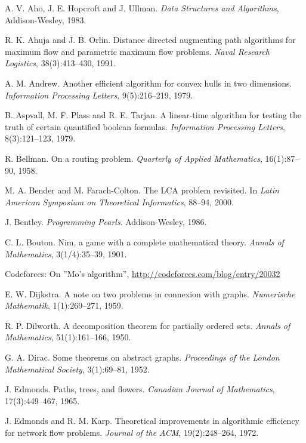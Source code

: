 \begin{thebibliography}{9}

  A. V. Aho, J. E. Hopcroft and J. Ullman.
  \emph{Data Structures and Algorithms},
  Addison-Wesley, 1983.

  R. K. Ahuja and J. B. Orlin.
  Distance directed augmenting path algorithms for maximum flow and parametric maximum flow problems.
  \emph{Naval Research Logistics}, 38(3):413--430, 1991.

  A. M. Andrew.
  Another efficient algorithm for convex hulls in two dimensions.
  \emph{Information Processing Letters}, 9(5):216--219, 1979.

  B. Aspvall, M. F. Plass and R. E. Tarjan.
  A linear-time algorithm for testing the truth of certain quantified boolean formulas.
  \emph{Information Processing Letters}, 8(3):121--123, 1979.

  R. Bellman.
  On a routing problem.
  \emph{Quarterly of Applied Mathematics}, 16(1):87--90, 1958.

  M. A. Bender and M. Farach-Colton.
  The LCA problem revisited. In
  \emph{Latin American Symposium on Theoretical Informatics}, 88--94, 2000.

  J. Bentley.
  \emph{Programming Pearls}.
  Addison-Wesley, 1986.

  C. L. Bouton.
  Nim, a game with a complete mathematical theory.
  \emph{Annals of Mathematics}, 3(1/4):35--39, 1901.

  Codeforces: On ''Mo's algorithm'',
  \url{http://codeforces.com/blog/entry/20032}

  E. W. Dijkstra.
  A note on two problems in connexion with graphs.
  \emph{Numerische Mathematik}, 1(1):269--271, 1959.

  R. P. Dilworth.
  A decomposition theorem for partially ordered sets.
  \emph{Annals of Mathematics}, 51(1):161--166, 1950.

  G. A. Dirac.
  Some theorems on abstract graphs.
  \emph{Proceedings of the London Mathematical Society}, 3(1):69--81, 1952.

  J. Edmonds.
  Paths, trees, and flowers.
  \emph{Canadian Journal of Mathematics}, 17(3):449--467, 1965.

  J. Edmonds and R. M. Karp.
  Theoretical improvements in algorithmic efficiency for network flow problems.
  \emph{Journal of the ACM}, 19(2):248--264, 1972.


\end{thebibliography}
